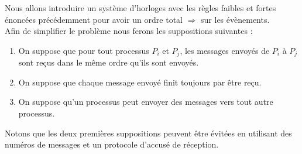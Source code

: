 \documentclass[compress]{beamer}
\begin{document}
\begin{frame}
Nous allons introduire un système d'horloges avec les règles faibles et fortes énoncées précédemment pour avoir un ordre total $\Rightarrow$ sur les évènements.\\ \bigskip
Afin de simplifier le problème nous ferons les suppositions suivantes : \\ \bigskip
\begin{enumerate}
\item On suppose que pour tout processus $P_i$ et $P_j$, les messages envoyés de $P_i$ à $P_j$ sont reçus dans le même ordre qu'ils sont envoyés. 
\item On suppose que chaque message envoyé finit toujours par être reçu.
\item On suppose qu'un processus peut envoyer des messages vers tout autre processus.
\end{enumerate}
Notons que les deux premières suppositions peuvent être évitées en utilisant des numéros de messages et un protocole d'accusé de réception.
\end{frame}
\end{document}
